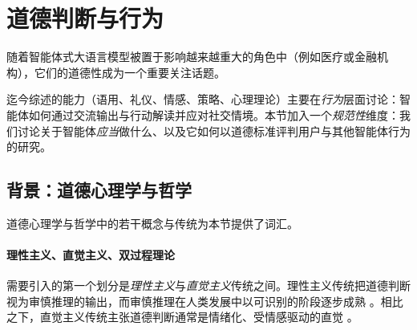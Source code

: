 



\section{道德判断与行为} \label{sec:moral}
随着智能体式大语言模型被置于影响越来越重大的角色中（例如医疗或金融机构），它们的道德性成为一个重要关注话题。

迄今综述的能力（语用、礼仪、情感、策略、心理理论）主要在\emph{行为}层面讨论：智能体如何通过交流输出与行动解读并应对社交情境。本节加入一个\emph{规范性}维度：我们讨论关于智能体\emph{应当}做什么、以及它如何以道德标准评判用户与其他智能体行为的研究。

\subsection{背景：道德心理学与哲学}
道德心理学与哲学中的若干概念与传统为本节提供了词汇。

\paragraph{理性主义、直觉主义、双过程理论} 需要引入的第一个划分是\emph{理性主义}与\emph{直觉主义}传统之间。理性主义传统把道德判断视为审慎推理的输出，而审慎推理在人类发展中以可识别的阶段逐步成熟 \citep[e.g.][]{kohlberg1969stage}。相比之下，直觉主义传统主张道德判断通常是情绪化、受情感驱动的直觉 \citep{haidt2001emotional}。

